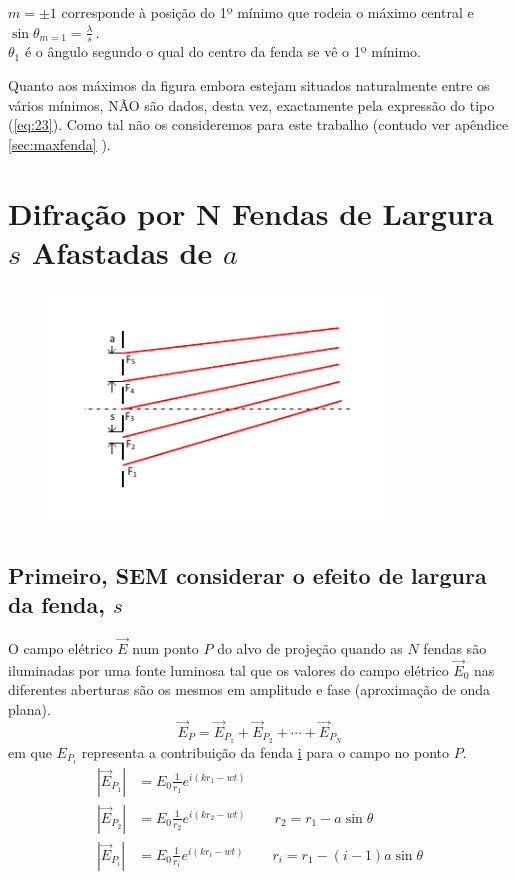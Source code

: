 \documentclass[a4paper,12pt]{article}
\begin{document}
$m= \pm 1 $ corresponde à posição do 1º mínimo que rodeia o máximo central e $\sin \theta_{m=1} = \frac{\lambda}{s}$\,.\\
 $\theta_1$ é o ângulo segundo o qual do centro da fenda se vê o 1º mínimo.

 Quanto  aos máximos da figura embora estejam situados naturalmente entre os vários mínimos, NÃO são dados, desta vez,  exactamente pela expressão do tipo (\ref{eq:23}). Como tal não os consideremos para este trabalho 
 (contudo ver apêndice \ref{sec:maxfenda} ).

\section{\sf Difração por N Fendas de Largura \underline{$s$} \mbox{Afastadas} de \underline{$a$}}

\begin{figure}
	[!tb]  \centering 
	\includegraphics[width=0.8\textwidth]{Nfendas} \caption{\label{fig:6}} 
\end{figure}

\subsection{Primeiro, SEM considerar o efeito de largura da fenda, $s$}

O campo elétrico $\vec{E}$ num ponto $P$ do alvo de projeção quando as $N$ fendas são iluminadas por uma fonte luminosa tal que os valores do campo elétrico $\vec{E}_0$ nas diferentes aberturas são os mesmos em amplitude e fase (aproximação de onda plana).
\begin{equation}
	\label{eq:37} \vec{E}_P = \vec{E}_{P_1} + \vec{E}_{P_2} +\cdots +\vec{E}_{P_N} 
\end{equation}
em que $E_{P_i}$ representa a contribuição da fenda \underline{i} para o campo no ponto $P$. 
\begin{align}
	\label{eq:38} |\vec{E}_{P_1}| &= E_0 \frac{1}{r_1} e^{i(k r_1 -wt)} \nonumber \\
	|\vec{E}_{P_2}| &= E_0 \frac{1}{r_2} e^{i(k r_2 -wt)} \qquad r_2 = r_1 - a \sin \theta \\
	|\vec{E}_{P_i}| &= E_0 \frac{1}{r_i} e^{i(k r_i -wt)}\qquad r_i = r_1 - (i-1) a \sin \theta \nonumber 
\end{align}
\end{document}
